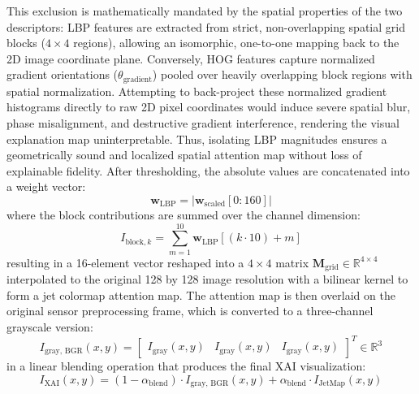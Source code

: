 This exclusion is mathematically mandated by the spatial properties of the two descriptors: LBP features are extracted from strict, non-overlapping spatial grid blocks ($4 \times 4$ regions), allowing an isomorphic, one-to-one mapping back to the 2D image coordinate plane. Conversely, HOG features capture normalized gradient orientations ($\theta_{\text{gradient}}$) pooled over heavily overlapping block regions with spatial normalization. Attempting to back-project these normalized gradient histograms directly to raw 2D pixel coordinates would induce severe spatial blur, phase misalignment, and destructive gradient interference, rendering the visual explanation map uninterpretable. Thus, isolating LBP magnitudes ensures a geometrically sound and localized spatial attention map without loss of explainable fidelity. After thresholding, the absolute values are concatenated into a weight vector:
\begin{equation}
\mathbf{w}_{\text{LBP}} = |\mathbf{w}_{\text{scaled}}[0 : 160]| \label{eq:lbp_weights_isolation}
\end{equation}
where the block contributions are summed over the channel dimension:
\begin{equation}
I_{\text{block}, k} = \sum_{m=1}^{10} \mathbf{w}_{\text{LBP}}[(k \cdot 10) + m] \label{eq:lbp_block_sum}
\end{equation}
resulting in a 16-element vector reshaped into a $4 \times 4$ matrix $\mathbf{M}_{\text{grid}} \in \mathbb{R}^{4 \times 4}$ interpolated to the original 128 by 128 image resolution with a bilinear kernel to form a jet colormap attention map. The attention map is then overlaid on the original sensor preprocessing frame, which is converted to a three-channel grayscale version:
\begin{equation}
I_{\text{gray, BGR}}(x,y) = \begin{bmatrix} I_{\text{gray}}(x,y) & I_{\text{gray}}(x,y) & I_{\text{gray}}(x,y) \end{bmatrix}^T \in \mathbb{R}^3 \label{eq:grayscale_expansion}
\end{equation}
in a linear blending operation that produces the final XAI visualization:
\begin{equation}
I_{\text{XAI}}(x,y) = (1 - \alpha_{\text{blend}}) \cdot I_{\text{gray, BGR}}(x,y) + \alpha_{\text{blend}} \cdot I_{\text{JetMap}}(x,y) \label{eq:alpha_blending}
\end{equation}
